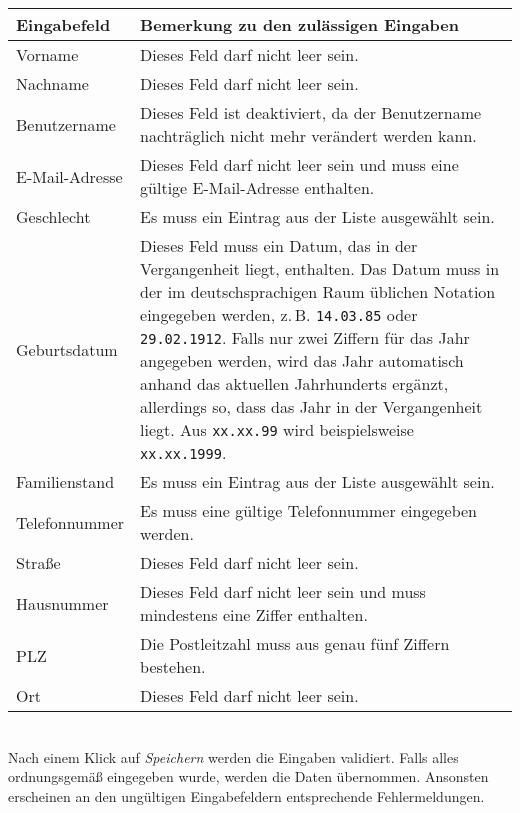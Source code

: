 \documentclass[12pt,a4paper]{article}
\begin{document}
\vspace{0.4cm}
\begin{tabularx}{\textwidth}{lX}
\toprule
\textbf{Eingabefeld} & \textbf{Bemerkung zu den zulässigen Eingaben} \\
\midrule
Vorname & Dieses Feld darf nicht leer sein. \\[.3cm]
Nachname & Dieses Feld darf nicht leer sein. \\[.3cm]
Benutzername & Dieses Feld ist deaktiviert, da der Benutzername nachträglich nicht mehr verändert werden kann. \\[.3cm]
E-Mail-Adresse & Dieses Feld darf nicht leer sein und muss eine gültige E-Mail-Adresse enthalten. \\[.3cm]
Geschlecht & Es muss ein Eintrag aus der Liste ausgewählt sein. \\[.3cm]
Geburtsdatum & Dieses Feld muss ein Datum, das in der Vergangenheit liegt, enthalten. Das Datum muss in der im deutschsprachigen Raum üblichen Notation eingegeben werden, z.\,B. \texttt{14.03.85} oder \texttt{29.02.1912}. \newline Falls nur zwei Ziffern für das Jahr angegeben werden, wird das Jahr automatisch anhand das aktuellen Jahrhunderts ergänzt, allerdings so, dass das Jahr in der Vergangenheit liegt. Aus \texttt{xx.xx.99} wird beispielsweise \texttt{xx.xx.1999}. \\[.3cm]
Familienstand & Es muss ein Eintrag aus der Liste ausgewählt sein. \\[.3cm]
Telefonnummer & Es muss eine gültige Telefonnummer eingegeben werden. \\[.3cm]
Straße & Dieses Feld darf nicht leer sein. \\[.3cm]
Hausnummer & Dieses Feld darf nicht leer sein und muss mindestens eine Ziffer enthalten. \\[.3cm]
PLZ & Die Postleitzahl muss aus genau fünf Ziffern bestehen. \\[.3cm]
Ort & Dieses Feld darf nicht leer sein. \\
\bottomrule
\end{tabularx} \\[.5cm]

Nach einem Klick auf \textit{Speichern}  werden die Eingaben validiert. Falls alles ordnungsgemäß eingegeben wurde, werden die Daten übernommen. Ansonsten erscheinen an den ungültigen Eingabefeldern entsprechende Fehlermeldungen.
\newpage
\end{document}
